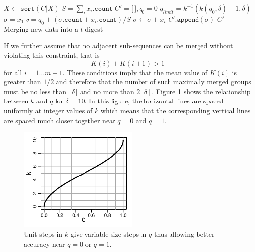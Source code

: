 \documentclass[11pt]{amsart}
\begin{document}
\begin{algorithm}[ht]
 \label{alg:merge}
\SetNoFillComment
{}
$X \gets \mathtt{sort}(C | X)$\;
$ S = \sum_i x_i.\mathtt{count}$\;
$C' = \lbrack \, \rbrack, q_0 = 0$\;
$q_{limit}=k^{-1}(k(q_0, \delta)+1, \delta)$\;
$\sigma = x_1$\;
 {
  $q = q_0 + (\sigma.\mathtt{count} + x_i.\mathtt{count})/S$\;
   {
      $\sigma \gets \sigma + x_i$\;
  } 
} 
$C'\mathtt{.append}(\sigma)$\;
\Return $ C' $\\
\caption{Merging new data into a $t$-digest}
\end{algorithm}

If we further assume that no adjacent sub-sequences can be merged without violating this constraint, that is
\[
K(i) + K(i+1) > 1
\]
for all $i=1\ldots m-1$. These conditions imply that the mean value of $K(i)$ is greater than $1/2$ and therefore that the number of such maximally merged groups must be no less than $ \lfloor\delta\rfloor$ and no more than $2\left \lceil\delta \right \rceil$. Figure \ref{fig:k-q-plot} shows the relationship between $k$ and $q$ for $\delta=10$. In this figure, the horizontal lines are spaced uniformly at integer values of $k$ which means that the corresponding vertical lines are spaced much closer together near $q=0$ and $q=1$.

\begin{figure}[htbp] %
   \centering
   \includegraphics[width=2.3in]{k-q-plot.pdf} 
   \caption{Unit steps in $k$ give variable size steps in $q$ thus allowing better accuracy near $q=0$ or $q=1$. }
   \label{fig:k-q-plot}
\end{figure}
\end{document}
